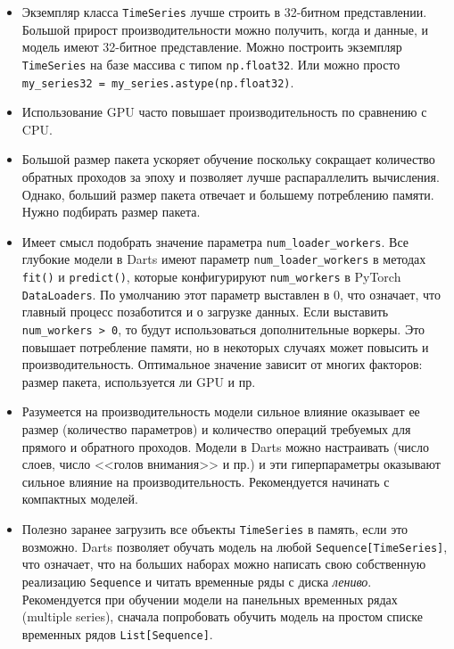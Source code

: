 \documentclass[%
	11pt,
	a4paper,
	utf8,
		]{article}
\begin{document}
\begin{itemize}
	\item Экземпляр класса \verb|TimeSeries| лучше строить в 32-битном представлении. Большой прирост производительности можно получить, когда и данные, и модель имеют 32-битное представление. Можно построить экземпляр \verb|TimeSeries| на базе массива с типом \verb|np.float32|. Или можно просто \verb|my_series32 = my_series.astype(np.float32)|.
	
	\item Использование GPU часто повышает производительность по сравнению с CPU.
	
	\item Большой размер пакета ускоряет обучение поскольку сокращает количество обратных проходов за эпоху и позволяет лучше распараллелить вычисления. Однако, больший размер пакета отвечает и большему потреблению памяти. Нужно подбирать размер пакета.
	
	\item Имеет смысл подобрать значение параметра \verb|num_loader_workers|. Все глубокие модели в Darts имеют параметр \verb|num_loader_workers| в методах \verb|fit()| и \verb|predict()|, которые конфигурируют \verb|num_workers| в PyTorch \verb|DataLoaders|. По умолчанию этот параметр выставлен в 0, что означает, что главный процесс позаботится и о загрузке данных. Если выставить \verb|num_workers > 0|, то будут использоваться дополнительные воркеры. Это повышает потребление памяти, но в некоторых случаях может повысить и производительность. Оптимальное значение зависит от многих факторов: размер пакета, используется ли GPU и пр.
	
	\item Разумеется на производительность модели сильное влияние оказывает ее размер (количество параметров) и количество операций требуемых для прямого и обратного проходов. Модели в Darts можно настраивать (число слоев, число <<голов внимания>> и пр.) и эти гиперпараметры оказывают сильное влияние на производительность. Рекомендуется начинать с компактных моделей.
	
	\item Полезно заранее загрузить все объекты \verb|TimeSeries| в память, если это возможно. Darts позволяет обучать модель на любой \verb|Sequence[TimeSeries]|, что означает, что на больших наборах можно написать свою собственную реализацию \verb|Sequence| и читать временные ряды с диска \emph{лениво}. Рекомендуется при обучении модели на панельных временных рядах (multiple series), сначала попробовать обучить модель на простом списке временных рядов \verb|List[Sequence]|.
	

\end{itemize}
\end{document}
